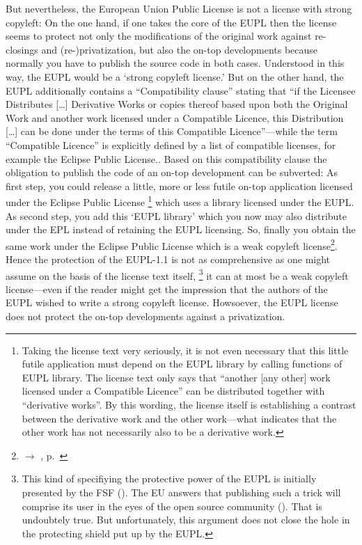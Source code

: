 But nevertheless, the European Union Public License is not a license with strong
copyleft: On the one hand, if one takes the core of the EUPL then the license
seems to protect not only the modifications of the original work against
re-closings and (re-)privatization, but also the on-top developments because
normally you have to publish the source code in both cases. Understood in this
way, the EUPL would be a `strong copyleft license.' But on the other hand, the
EUPL additionally contains a \enquote{Compatibility clause} stating that
\enquote{if the Licensee Distributes [\ldots] Derivative Works or copies thereof
based upon both the Original Work and another work licensed under a Compatible
Licence, this Distribution [\ldots] can be done under the terms of this
Compatible Licence}---while the term \enquote{Compatible Licence}
is explicitly defined by a list of compatible licenses, for example the Eclipse
Public License.. Based on this compatibility clause the
obligation to publish the code of an on-top development can be subverted: As
first step, you could release a little, more or less futile on-top application
licensed under the Eclipse Public License%
  \footnote{Taking the license text very seriously, it is not even necessary
  that this little futile application must depend on the EUPL library by calling
  functions of EUPL library. The license text only says that \enquote{another
  [any other] work licensed under a Compatible Licence} can be distributed
  together with \enquote{derivative works}. By this wording, the license itself
  is establishing a contrast between the derivative work and the other
  work---what indicates that the other work has not necessarily also to be a
  derivative work.} 
which uses a library licensed under the EUPL. As second step, you add this `EUPL
library' which you now may also distribute under the EPL instead of retaining
the EUPL licensing. So, finally you obtain the same work under the Eclipse
Public License which is a weak copyleft license\footnote{$\rightarrow$ \oslic,
p.\ }. Hence the protection of the EUPL-1.1 is
not as comprehensive as one might assume on the basis of the license text
itself,%
  \footnote{This kind of specifiying the protective power of the EUPL is
  initially presented by the FSF (\cite[cf.][wp.\ section `European Union
  Public License']{FsfLicenseList2013a}). The EU answers that publishing such a
  trick will comprise its user in the eyes of the open source community
  (\cite[cf.][wp]{FsfEuplRecomment2013}). That is undoubtely true. But
  unfortunately, this argument does not close the hole in the protecting shield
  put up by the EUPL.}
it can at most be a weak copyleft license---even if the reader might get the
impression that the authors of the EUPL wished to write a strong copyleft
license. Howsoever, the EUPL license does not protect the on-top developments
against a privatization. 

